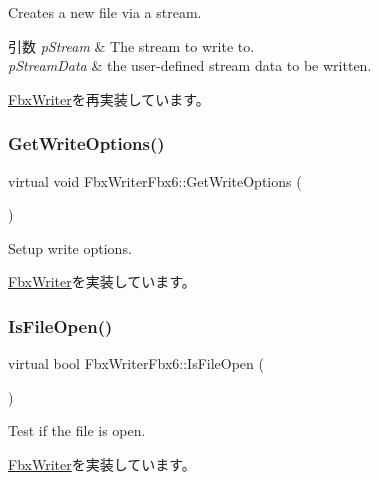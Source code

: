 Creates a new file via a stream. 
\begin{DoxyParams}{引数}
{\em p\+Stream} & The stream to write to. \\
\hline
{\em p\+Stream\+Data} & the user-\/defined stream data to be written. \\
\hline
\end{DoxyParams}


\hyperlink{class_fbx_writer_a9b64b6230b05e64a83b78b36d1667da7}{Fbx\+Writer}を再実装しています。

\mbox{\label{class_fbx_writer_fbx6_a62f398d8ed2746ea076481d920f481e4}} 
\subsubsection{\texorpdfstring{Get\+Write\+Options()}{GetWriteOptions()}}
{\footnotesize\ttfamily virtual void Fbx\+Writer\+Fbx6\+::\+Get\+Write\+Options (\begin{DoxyParamCaption}{ }\end{DoxyParamCaption})\hspace{0.3cm}{\ttfamily [virtual]}}

Setup write options. 

\hyperlink{class_fbx_writer_ad237f5cd183ae29f744aee32b7aa5525}{Fbx\+Writer}を実装しています。

\mbox{\label{class_fbx_writer_fbx6_ada26031c01e10e3f54431739e9286d64}} 
\subsubsection{\texorpdfstring{Is\+File\+Open()}{IsFileOpen()}}
{\footnotesize\ttfamily virtual bool Fbx\+Writer\+Fbx6\+::\+Is\+File\+Open (\begin{DoxyParamCaption}{ }\end{DoxyParamCaption})\hspace{0.3cm}{\ttfamily [virtual]}}

Test if the file is open. 

\hyperlink{class_fbx_writer_ab70be3aaebd304af11cdce5e225cce68}{Fbx\+Writer}を実装しています。

